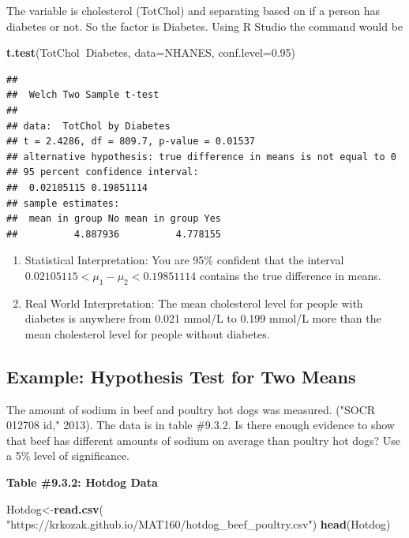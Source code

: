 \documentclass[
]{book}
\newenvironment{Shaded}{\begin{snugshade}}{\end{snugshade}}
\newcommand{\DataTypeTok}[1]{\textcolor[rgb]{0.13,0.29,0.53}{#1}}
\newcommand{\FloatTok}[1]{\textcolor[rgb]{0.00,0.00,0.81}{#1}}
\newcommand{\KeywordTok}[1]{\textcolor[rgb]{0.13,0.29,0.53}{\textbf{#1}}}
\newcommand{\NormalTok}[1]{#1}
\newcommand{\OperatorTok}[1]{\textcolor[rgb]{0.81,0.36,0.00}{\textbf{#1}}}
\newcommand{\StringTok}[1]{\textcolor[rgb]{0.31,0.60,0.02}{#1}}
\begin{document}
The variable is cholesterol (TotChol) and separating based on if a person has diabetes or not. So the factor is Diabetes. Using R Studio the command would be

\begin{Shaded}
\begin{Highlighting}[]
\KeywordTok{t.test}\NormalTok{(TotChol}\OperatorTok{~}\NormalTok{Diabetes, }\DataTypeTok{data=}\NormalTok{NHANES, }\DataTypeTok{conf.level=}\FloatTok{0.95}\NormalTok{)}
\end{Highlighting}
\end{Shaded}

\begin{verbatim}
## 
## 	Welch Two Sample t-test
## 
## data:  TotChol by Diabetes
## t = 2.4286, df = 809.7, p-value = 0.01537
## alternative hypothesis: true difference in means is not equal to 0
## 95 percent confidence interval:
##  0.02105115 0.19851114
## sample estimates:
##  mean in group No mean in group Yes 
##          4.887936          4.778155
\end{verbatim}

\begin{enumerate}
\def\labelenumi{\arabic{enumi}.}
\setcounter{enumi}{3}
\item
  Statistical Interpretation: You are 95\% confident that the interval \(0.02105115<\mu_1-\mu_2<0.19851114\) contains the true difference in means.
\item
  Real World Interpretation: The mean cholesterol level for people with diabetes is anywhere from 0.021 mmol/L to 0.199 mmol/L more than the mean cholesterol level for people without diabetes.
\end{enumerate}

\hypertarget{example-hypothesis-test-for-two-means-1}{%
\subsection{Example: Hypothesis Test for Two Means}\label{example-hypothesis-test-for-two-means-1}}

The amount of sodium in beef and poultry hot dogs was measured. ("SOCR 012708 id," 2013). The data is in table \#9.3.2. Is there enough evidence to show that beef has different amounts of sodium on average than poultry hot dogs? Use a 5\% level of significance.

\textbf{Table \#9.3.2: Hotdog Data}

\begin{Shaded}
\begin{Highlighting}[]
\NormalTok{Hotdog<-}\KeywordTok{read.csv}\NormalTok{(}
  \StringTok{"https://krkozak.github.io/MAT160/hotdog_beef_poultry.csv"}\NormalTok{)}
\KeywordTok{head}\NormalTok{(Hotdog)}
\end{Highlighting}
\end{Shaded}
\end{document}
